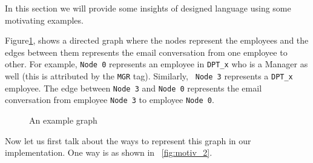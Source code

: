 In this section we will provide some insights of designed language
using some motivating examples.

\begin{example}{\rm
Figure\ref{fig:motiv_1}, shows a directed graph where the nodes represent the 
  employees
and the edges between them represents the email conversation from one employee 
to other. For example, {\tt Node 0} represents an employee in {\tt DPT\_x} who 
is a Manager as well (this is attributed by the {\tt MGR} tag). Similarly, {\tt 
  Node 3} represents a {\tt DPT\_x} employee. The edge between {\tt Node 3} and 
  {\tt Node 0} represents the email conversation from employee {\tt Node 3} to 
employee {\tt Node 0}.

\begin{figure}
  \begin{center}
  \end{center}
  \caption{An example graph}
  \label{fig:motiv_1}
\end{figure}

  Now let us first talk about the ways to represent this graph in our 
    implementation. One way is as 
    shown in ~\ref{fig:motiv_2}. 

}
\end{example}
